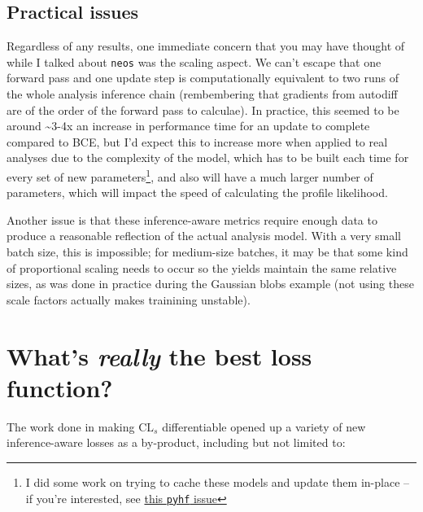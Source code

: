 \documentclass[
  11pt,
  numbers=noendperiod]{book}
\begin{document}
\hypertarget{sec-neos-issues}{%
\subsection{Practical issues}\label{sec-neos-issues}}

Regardless of any results, one immediate concern that you may have
thought of while I talked about \texttt{neos} was the scaling aspect. We
can't escape that one forward pass and one update step is
computationally equivalent to two runs of the whole analysis inference
chain (rembembering that gradients from autodiff are of the order of the
forward pass to calculae). In practice, this seemed to be around
\textasciitilde3-4x an increase in performance time for an update to
complete compared to BCE, but I'd expect this to increase more when
applied to real analyses due to the complexity of the model, which has
to be built each time for every set of new parameters\footnote{I did
  some work on trying to cache these models and update them in-place --
  if you're interested, see
  \href{https://github.com/scikit-hep/pyhf/issues/1894}{this
  \texttt{pyhf} issue}}, and also will have a much larger number of
parameters, which will impact the speed of calculating the profile
likelihood.

Another issue is that these inference-aware metrics require enough data
to produce a reasonable reflection of the actual analysis model. With a
very small batch size, this is impossible; for medium-size batches, it
may be that some kind of proportional scaling needs to occur so the
yields maintain the same relative sizes, as was done in practice during
the Gaussian blobs example (not using these scale factors actually makes
trainining unstable).

\hypertarget{whats-really-the-best-loss-function}{%
\section{\texorpdfstring{What's \emph{really} the best loss
function?}{What's really the best loss function?}}\label{whats-really-the-best-loss-function}}

The work done in making \(\mathrm{CL}_s\) differentiable opened up a
variety of new inference-aware losses as a by-product, including but not
limited to:
\end{document}
